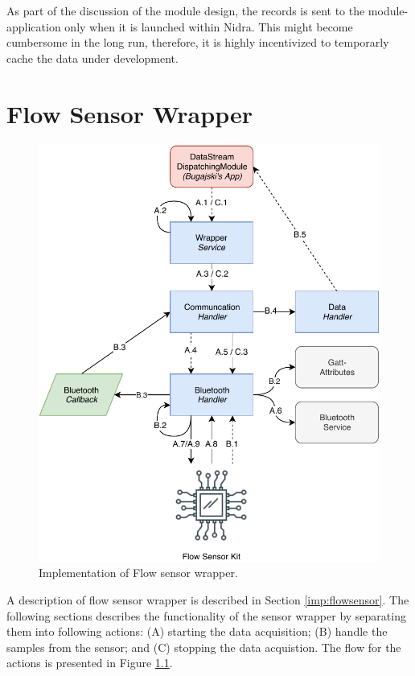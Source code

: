 As part of the discussion of the module design, the records is sent to the module-application only when it is launched within Nidra. This might become cumbersome in the long run, therefore, it is highly incentivized to temporarly cache the data under development. 


\chapter{Flow Sensor Wrapper}

\begin{figure}[!h]
    \centering
    \includegraphics[scale=0.7]{images/Flow_Imp.pdf}
    \caption{Implementation of Flow sensor wrapper.}
    \label{fig:impl_flowsensor}
\end{figure}

A description of flow sensor wrapper is described in Section \ref{imp:flowsensor}. The following sections describes the functionality of the sensor wrapper by separating them into following actions: (A) starting the data acquisition; (B) handle the samples from the sensor; and (C) stopping the data acquistion. The flow for the actions is presented in Figure \ref{fig:impl_flowsensor}.

